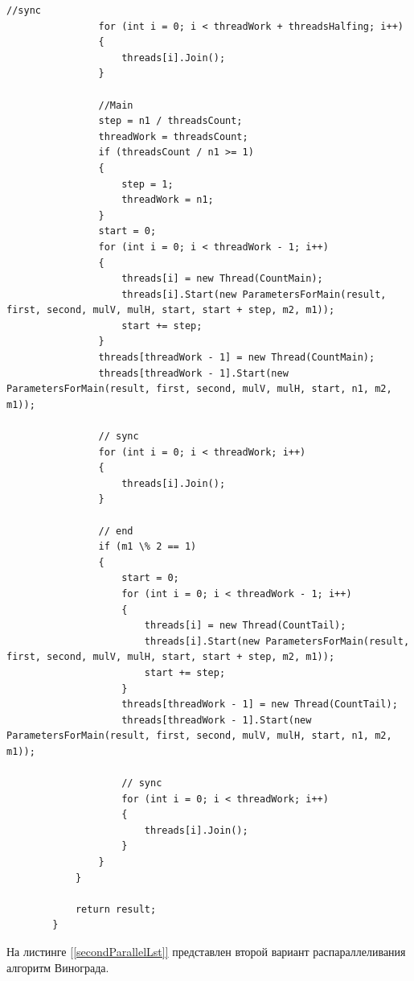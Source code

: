 \documentclass{article}
\begin{document}
\begin{lstlisting}[label=firstParallelLst,caption=Первый вариант распараллеливания алгоритм Винограда]
                //sync
                for (int i = 0; i < threadWork + threadsHalfing; i++)
                {
                    threads[i].Join();
                }

                //Main
                step = n1 / threadsCount;
                threadWork = threadsCount;
                if (threadsCount / n1 >= 1)
                {
                    step = 1;
                    threadWork = n1;
                }
                start = 0;
                for (int i = 0; i < threadWork - 1; i++)
                {
                    threads[i] = new Thread(CountMain);
                    threads[i].Start(new ParametersForMain(result, first, second, mulV, mulH, start, start + step, m2, m1));
                    start += step;
                }
                threads[threadWork - 1] = new Thread(CountMain);
                threads[threadWork - 1].Start(new ParametersForMain(result, first, second, mulV, mulH, start, n1, m2, m1));

                // sync
                for (int i = 0; i < threadWork; i++)
                {
                    threads[i].Join();
                }

                // end
                if (m1 \% 2 == 1)
                {
                    start = 0;
                    for (int i = 0; i < threadWork - 1; i++)
                    {
                        threads[i] = new Thread(CountTail);
                        threads[i].Start(new ParametersForMain(result, first, second, mulV, mulH, start, start + step, m2, m1));
                        start += step;
                    }
                    threads[threadWork - 1] = new Thread(CountTail);
                    threads[threadWork - 1].Start(new ParametersForMain(result, first, second, mulV, mulH, start, n1, m2, m1));

                    // sync
                    for (int i = 0; i < threadWork; i++)
                    {
                        threads[i].Join();
                    }
                }
            }

            return result;
        }
	\end{lstlisting}
		На листинге \hyperref[secondParallelLst]{[\ref{secondParallelLst}]} представлен второй вариант распараллеливания алгоритм Винограда.
\end{document}
